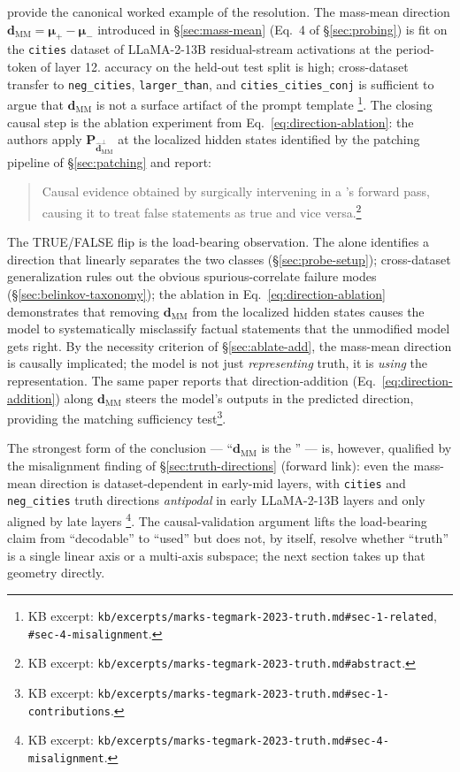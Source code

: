 \citet{marks-tegmark-2023-truth} provide the canonical worked example
of the resolution. The mass-mean direction
$\mathbf{d}_{\mathrm{MM}} = \boldsymbol{\mu}_+ - \boldsymbol{\mu}_-$
introduced in \S\ref{sec:mass-mean} (Eq.~4 of \S\ref{sec:probing}) is
fit on the \texttt{cities} dataset of LLaMA-2-13B residual-stream
activations at the period-token of layer 12.  accuracy on the
held-out test split is high; cross-dataset transfer to
\texttt{neg\_cities}, \texttt{larger\_than}, and \texttt{cities\_cities\_conj}
is sufficient to argue that $\mathbf{d}_{\mathrm{MM}}$ is not a
surface artifact of the prompt template
\citep[\S 1.1, \S 4]{marks-tegmark-2023-truth}\footnote{KB excerpt:
\texttt{kb/excerpts/marks-tegmark-2023-truth.md\#sec-1-related},
\texttt{\#sec-4-misalignment}.}. The closing causal step is the
ablation experiment from Eq.~\eqref{eq:direction-ablation}: the
authors apply
$\mathbf{P}_{\hat{\mathbf{d}}_{\mathrm{MM}}^\perp}$ at the localized
hidden states identified by the patching pipeline of
\S\ref{sec:patching} and report:
\begin{quote}
Causal evidence obtained by surgically intervening in a 's forward
pass, causing it to treat false statements as true and vice
versa.\hfill\citep[abstract]{marks-tegmark-2023-truth}\footnote{KB
excerpt: \texttt{kb/excerpts/marks-tegmark-2023-truth.md\#abstract}.}
\end{quote}
The TRUE/FALSE flip is the load-bearing observation. The  alone
identifies a direction that linearly separates the two classes
(\S\ref{sec:probe-setup}); cross-dataset generalization rules out the
obvious spurious-correlate failure modes (\S\ref{sec:belinkov-taxonomy});
the ablation in Eq.~\eqref{eq:direction-ablation} demonstrates that
removing $\mathbf{d}_{\mathrm{MM}}$ from the localized hidden states
causes the model to systematically misclassify factual statements
that the unmodified model gets right. By the necessity criterion of
\S\ref{sec:ablate-add}, the mass-mean direction is causally
implicated; the model is not just \emph{representing} truth, it is
\emph{using} the representation. The same paper reports that
direction-addition (Eq.~\eqref{eq:direction-addition}) along
$\mathbf{d}_{\mathrm{MM}}$ steers the model's outputs in the predicted
direction, providing the matching sufficiency
test\footnote{KB excerpt: \texttt{kb/excerpts/marks-tegmark-2023-truth.md\#sec-1-contributions}.}.

The strongest form of the conclusion --- ``$\mathbf{d}_{\mathrm{MM}}$
is the '' --- is, however, qualified by the misalignment
finding of \S\ref{sec:truth-directions} (forward link): even the
mass-mean direction is dataset-dependent in early-mid layers, with
\texttt{cities} and \texttt{neg\_cities} truth directions
\emph{antipodal} in early LLaMA-2-13B layers and only aligned by
late layers \citep[\S 4]{marks-tegmark-2023-truth}\footnote{KB excerpt:
\texttt{kb/excerpts/marks-tegmark-2023-truth.md\#sec-4-misalignment}.}.
The causal-validation argument lifts the load-bearing claim from
``decodable'' to ``used'' but does not, by itself, resolve whether
``truth'' is a single linear axis or a multi-axis subspace; the next
section takes up that geometry directly.

